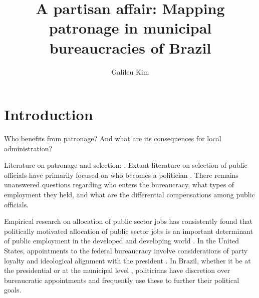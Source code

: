 \documentclass[12pt,a4paper]{article}
\title{A partisan affair: Mapping patronage in municipal bureaucracies of Brazil}
\author{Galileu Kim}
\affil{Princeton University}
\begin{document}
\maketitle


\newpage

\section{Introduction}
\label{sec:intro}

Who benefits from patronage? And what are its consequences for local administration? 

Literature on patronage and selection: \citet{robinson2013political}. Extant literature on selection of public officials have primarily focused on who becomes a politician \citet{dal2017becomes}. There remains unanswered questions regarding who enters the bureaucracy, what types of employment they held, and what are the differential compensations among public officials.

Empirical research on allocation of public sector jobs has consistently found that politically motivated allocation of public sector jobs is an important determinant of public employment in the developed and developing world \citep{finan2017personnel}. In the United States, appointments to the federal bureaucracy involve considerations of party loyalty and ideological alignment with the president \citep{lewis2010politics, hollibaugh2014presidents}. In Brazil, whether it be at the presidential \citep{pracca2011political} or at the municipal level \citep{colonnelli2018patronage,brollo2017victor}, politicians have discretion over bureaucratic appointments and frequently use these to further their political goals.
\end{document}
